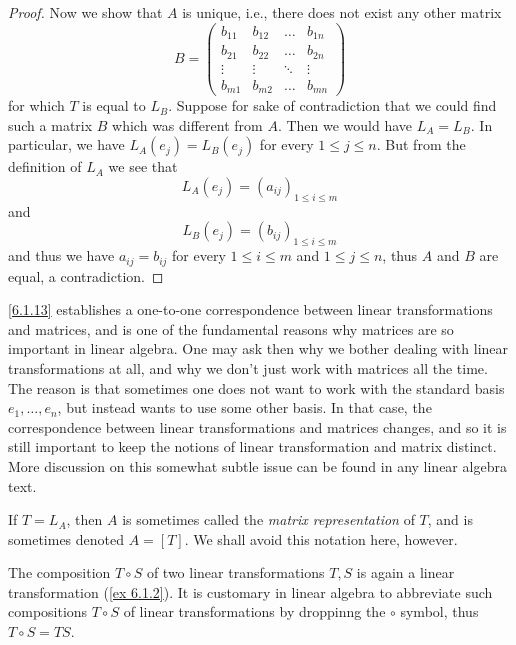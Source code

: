\begin{proof}
  Now we show that \(A\) is unique, i.e., there does not exist any other matrix
  \[
    B = \begin{pmatrix}
      b_{11} & b_{12} & \dots  & b_{1n} \\
      b_{21} & b_{22} & \dots  & b_{2n} \\
      \vdots & \vdots & \ddots & \vdots \\
      b_{m1} & b_{m2} & \dots  & b_{mn}
    \end{pmatrix}
  \]
  for which \(T\) is equal to \(L_B\).
  Suppose for sake of contradiction that we could find such a matrix \(B\) which was different from \(A\).
  Then we would have \(L_A = L_B\).
  In particular, we have \(L_A(e_j) = L_B(e_j)\) for every \(1 \leq j \leq n\).
  But from the definition of \(L_A\) we see that
  \[
    L_A(e_j) = (a_{ij})_{1 \leq i \leq m}
  \]
  and
  \[
    L_B(e_j) = (b_{ij})_{1 \leq i \leq m}
  \]
  and thus we have \(a_{ij} = b_{ij}\) for every \(1 \leq i \leq m\) and \(1 \leq j \leq n\), thus \(A\) and \(B\) are equal, a contradiction.
\end{proof}

\begin{remark}\label{6.1.14}
  \cref{6.1.13} establishes a one-to-one correspondence between linear transformations and matrices, and is one of the fundamental reasons why matrices are so important in linear algebra.
  One may ask then why we bother dealing with linear transformations at all, and why we don't just work with matrices all the time.
  The reason is that sometimes one does not want to work with the standard basis \(e_1, \dots, e_n\), but instead wants to use some other basis.
  In that case, the correspondence between linear transformations and matrices changes, and so it is still important to keep the notions of linear transformation and matrix distinct.
  More discussion on this somewhat subtle issue can be found in any linear algebra text.
\end{remark}

\begin{remark}\label{6.1.15}
  If \(T = L_A\), then \(A\) is sometimes called the \emph{matrix representation} of \(T\), and is sometimes denoted \(A = [T]\).
  We shall avoid this notation here, however.
\end{remark}

\begin{note}
  The composition \(T \circ S\) of two linear transformations \(T, S\) is again a linear transformation (\cref{ex 6.1.2}).
  It is customary in linear algebra to abbreviate such compositions \(T \circ S\) of linear transformations by droppinng the \(\circ\) symbol, thus \(T \circ S = TS\).
\end{note}

